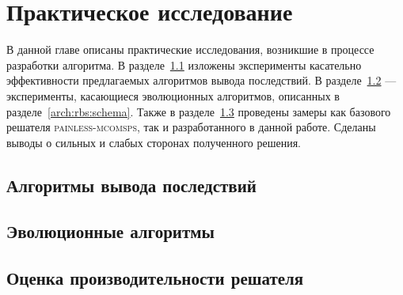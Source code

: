 \chapter{Практическое исследование}\label{research}

В данной главе описаны практические исследования, возникшие в процессе разработки алгоритма.
В разделе~\ref{research:prop} изложены эксперименты касательно эффективности предлагаемых
алгоритмов вывода последствий. В разделе~\ref{research:evol} --- эксперименты, касающиеся
эволюционных алгоритмов, описанных в разделе~\ref{arch:rbs:schema}. Также в разделе~\ref{research:final}
проведены замеры как базового решателя \textsc{painless-mcomsps}, так и разработанного в данной 
работе. Сделаны выводы о сильных и слабых сторонах полученного решения.

\section{Алгоритмы вывода последствий}\label{research:prop}

\section{Эволюционные алгоритмы}\label{research:evol}

\section{Оценка производительности решателя}\label{research:final}

\chapterconclusion

